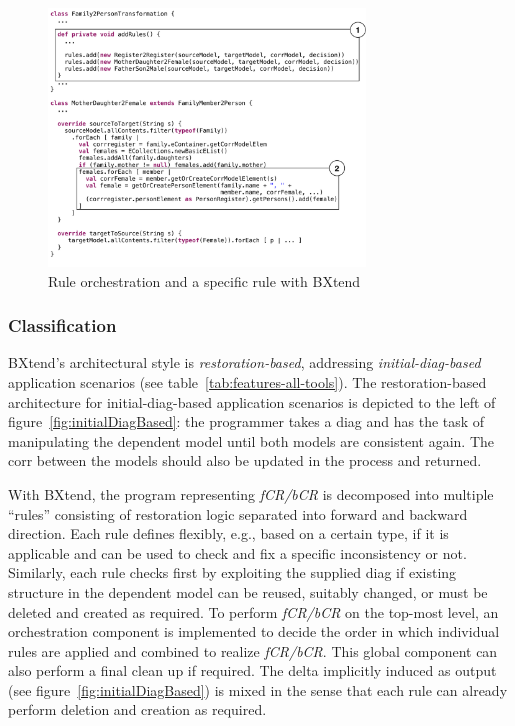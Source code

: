 \begin{figure}[tb!]
	\centering
	\includegraphics[width=0.75\textwidth]{diagrams/solutions/bxtendSoln}
	\caption{Rule orchestration and a specific rule with BXtend}
	\label{fig:bxtendSoln}
\end{figure}

\subsubsection{Classification}

BXtend's architectural style is \emph{restoration-based}, addressing \emph{initial-diag-based} application scenarios (see table~\ref{tab:features-all-tools}).
The re\-storation-based architecture for initial-diag-based application scenarios is depicted to the left of figure~\ref{fig:initialDiagBased}:  the programmer takes a diag and has the task of manipulating the dependent model until both models are consistent again.
The corr between the models should also be updated in the process and returned.

With BXtend, the program representing \emph{fCR/bCR} is decomposed into multiple ``rules'' consisting of restoration logic separated into forward and backward direction.
Each rule defines flexibly, e.g., based on a certain type, if it is applicable and can be used to check and fix a specific inconsistency or not.
Similarly, each rule checks first by exploiting the supplied diag if existing structure in the dependent model can be reused, suitably changed, or must be deleted and created as required.
To perform \emph{fCR/bCR} on the top-most level, an orchestration component is implemented to decide the order in which individual rules are applied and combined to realize \emph{fCR/bCR}.
This global component can also perform a final clean up if required.
The delta implicitly induced as output (see figure~\ref{fig:initialDiagBased}) is mixed in the sense that each rule can already perform deletion and creation as required.

